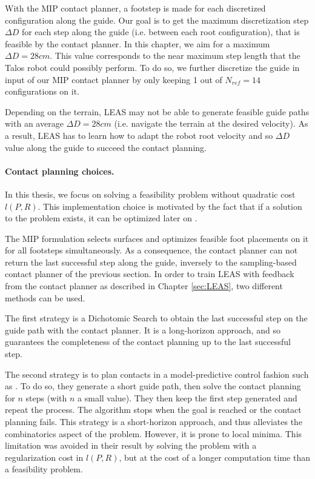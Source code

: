 With the MIP contact planner, a footstep is made for each discretized configuration along the guide.
Our goal is to get the maximum discretization step $\Delta D$ for each step along the guide (i.e. between each root configuration), that is feasible by the contact planner.
In this chapter, we aim for a maximum $\Delta D=28cm$. 
This value corresponds to the near maximum step length that the Talos robot could possibly perform.
To do so, we further discretize the guide in input of our MIP contact planner by only keeping 1 out of $N_{ref}=14$ configurations on it.

Depending on the terrain, LEAS may not be able to generate feasible guide paths with an average $\Delta D=28cm$ (i.e. navigate the terrain at the desired velocity).
As a result, LEAS has to learn how to adapt the robot root velocity and so $\Delta D$ value along the guide to succeed the contact planning.


\paragraph{Contact planning choices.}
In this thesis, we focus on solving a feasibility problem without quadratic cost $l(P,R)$.
This implementation choice is motivated by the fact that if a solution to the problem exists, it can be optimized later on \cite{sl1m_v2}.

The MIP formulation selects surfaces and optimizes feasible foot placements on it for all footsteps simultaneously.
As a consequence, the contact planner can not return the last successful step along the guide, inversely to the sampling-based contact planner of the previous section.
In order to train LEAS with feedback from the contact planner as described in Chapter \ref{sec:LEAS}, two different methods can be used.

The first strategy is a Dichotomic Search to obtain the last successful step on the guide path with the contact planner. 
It is a long-horizon approach, and so guarantees the completeness of the contact planning up to the last successful step. %

The second strategy is to plan contacts in a model-predictive control fashion such as \cite{fanny_mip_solo}. 
To do so, they generate a short guide path, then solve the contact planning for $n$ steps (with $n$ a small value).
They then keep the first step generated and repeat the process.
The algorithm stops when the goal is reached or the contact planning fails.
This strategy is a short-horizon approach, and thus alleviates the combinatorics aspect of the problem. 
However, it is prone to local minima.
This limitation was avoided in their result by solving the problem with a regularization cost in $l(P,R)$, but at the cost of a longer computation time than a feasibility problem.

